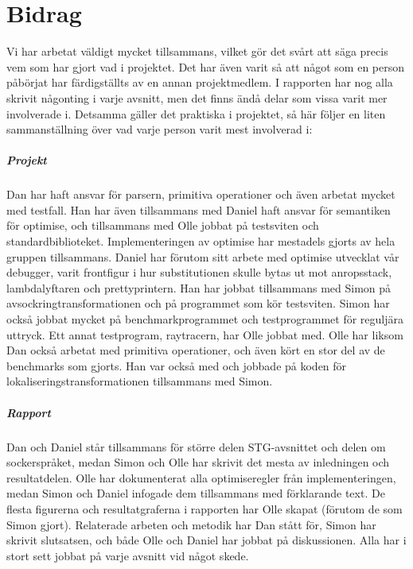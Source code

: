 \documentclass[../Appendix]{subfiles}
\begin{document}
\chapter{Bidrag}

Vi har arbetat väldigt mycket tillsammans, vilket gör det svårt att säga precis
vem som har gjort vad i projektet. Det har även varit så att något som en person
påbörjat har färdigställts av en annan projektmedlem. I rapporten har nog alla
skrivit någonting i varje avsnitt, men det finns ändå delar som vissa varit mer
involverade i. Detsamma gäller det praktiska i projektet, så här följer en
liten sammanställning över vad varje person varit mest involverad i:

\paragraph{Projekt}
Dan har haft ansvar för parsern, primitiva operationer och även arbetat 
mycket med testfall. Han har även tillsammans med Daniel haft ansvar
för semantiken för optimise, och tillsammans med Olle jobbat på testsviten och
standardbiblioteket. Implementeringen av optimise har mestadels
gjorts av hela gruppen tillsammans. Daniel har förutom sitt arbete med optimise 
utvecklat vår debugger, varit frontfigur i hur substitutionen skulle bytas 
ut mot anropsstack, lambdalyftaren och prettyprintern. Han har jobbat 
tillsammans med Simon på avsockringtransformationen och 
på programmet som kör testsviten. Simon
har också jobbat mycket på benchmarkprogrammet och testprogrammet
för reguljära uttryck. Ett annat testprogram, raytracern, har Olle jobbat med.
Olle har liksom Dan också arbetat med primitiva operationer, och även kört
en stor del av de benchmarks som gjorts. Han var också med och jobbade på koden för 
lokaliseringstransformationen tillsammans med Simon.


\paragraph{Rapport}
Dan och Daniel står tillsammans för större delen STG-avsnittet och delen om sockerspråket,
medan Simon och Olle har skrivit det mesta av inledningen och resultatdelen. 
Olle har dokumenterat alla optimiseregler från implementeringen,
medan Simon och Daniel infogade dem tillsammans med förklarande text. 
De flesta figurerna och
resultatgraferna i rapporten har Olle skapat (förutom de som Simon gjort).
Relaterade arbeten och metodik har Dan stått för, Simon har skrivit slutsatsen,
och både Olle och Daniel har jobbat på diskussionen. Alla har i stort sett jobbat på varje
avsnitt vid något skede.
\end{document}
